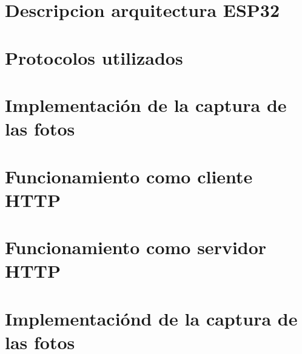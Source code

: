 
\section{Descripcion arquitectura ESP32}

\section{Protocolos utilizados} 

\section{Implementación de la captura de las fotos}

\section{Funcionamiento como cliente HTTP} 

\section{Funcionamiento como servidor HTTP} 

\section{Implementaciónd de la captura de las fotos}
